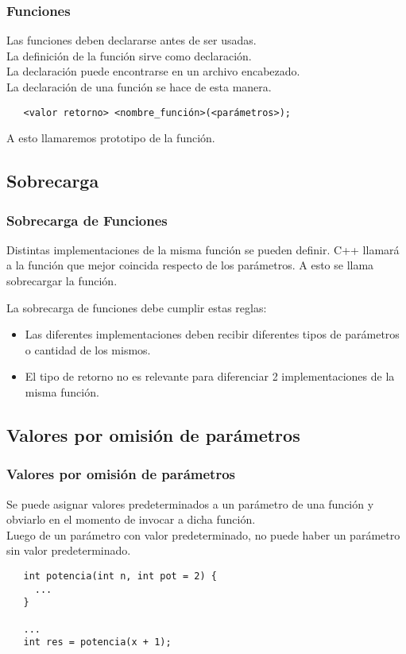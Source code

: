 \documentclass{beamer}
\begin{document}
\begin{frame}[fragile]
\frametitle{Funciones}

Las funciones deben declararse antes de ser usadas. \\
La definición de la función sirve como declaración. \\
La declaración puede encontrarse en un archivo encabezado. \\
La declaración de una función se hace de esta manera.
\begin{verbatim}
   <valor retorno> <nombre_función>(<parámetros>);
\end{verbatim}
A esto llamaremos prototipo de la función.
\end{frame}

\subsection{Sobrecarga}
\begin{frame}[fragile]
\frametitle{Sobrecarga de Funciones}
Distintas implementaciones de la misma función se pueden definir. C++ llamará
a la función que mejor coincida respecto de los parámetros. A esto se llama sobrecargar la función.

La sobrecarga de funciones debe cumplir estas reglas:
\begin{itemize}
 \item Las diferentes implementaciones deben recibir diferentes tipos de parámetros o cantidad de los mismos.
 \item El tipo de retorno no es relevante para diferenciar 2 implementaciones de la misma función.
\end{itemize}

\end{frame}

\subsection{Valores por omisión de parámetros}
\begin{frame}[fragile]
\frametitle{Valores por omisión de parámetros}

Se puede asignar valores predeterminados a un parámetro de una función y 
obviarlo en el momento de invocar a dicha función. \\
Luego de un parámetro con valor predeterminado, no puede haber un parámetro sin valor predeterminado.

\begin{verbatim}
   int potencia(int n, int pot = 2) {
     ...
   }

   ...
   int res = potencia(x + 1);
\end{verbatim}


\end{frame}
\end{document}
